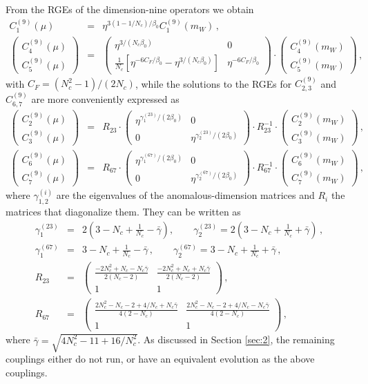 \documentclass[letterpaper,11pt]{article}
\newcommand{\bt}{\beta}
\newcommand{\g}{\gamma}
\newcommand{\bea}{\begin{eqnarray}}
\newcommand{\eea}{\end{eqnarray}}
\newcommand{\bma}{\begin{pmatrix}}
\newcommand{\ema}{\end{pmatrix}}
\newcommand{\sq}{^{2}}
\newcommand{\nn}{\nonumber}
\begin{document}
From the RGEs of the dimension-nine operators we obtain
\bea
C_1^{(9)}(\mu) &=& \eta^{3(1-1/N_c)/\bt_0} C_1^{(9)}(m_W)\,,\nn\\
\bma C_4^{(9)}(\mu)\\C_5^{(9)}(\mu)\ema  &=& 
\bma
\eta ^{3/(N_c \bt_0)} &0\\ \frac{1}{N_c}\left[\eta ^{-6C_F/ \bt_0}-\eta ^{3/(N_c \bt_0)}\right] & \eta ^{-6C_F/ \bt_0}
\ema
\cdot \bma C_4^{(9)}(m_W)\\C_5^{(9)}(m_W)\ema  \,,
\eea
with $C_F = (N_c\sq-1)/(2N_c)$, while the solutions to the RGEs for  $C_{2,3}^{(9)}$ and $C_{6,7}^{(9)}$ are more conveniently expressed as
\bea
\bma C_2^{(9)}(\mu)\\C_3^{(9)}(\mu)\ema  &=& R_{23}\cdot \bma
\eta^{\g_1^{(23)}/(2\bt_0)}&0\\ 0& \eta^{\g_2^{(23)}/(2\bt_0)}
\ema\cdot R^{-1}_{23}
\cdot \bma C_2^{(9)}(m_W)\\C_3^{(9)}(m_W)\ema  \,,\nn\\
\bma C_6^{(9)}(\mu)\\C_7^{(9)}(\mu)\ema  &=& R_{67}\cdot \bma
\eta^{\g_1^{(67)}/(2\bt_0)}&0\\ 0& \eta^{\g_2^{(67)}/(2\bt_0)}
\ema\cdot R_{67}^{-1}
\cdot \bma C_6^{(9)}(m_W)\\C_7^{(9)}(m_W)\ema  \,,
\eea
where $\g_{1,2}^{(i)}$ are the eigenvalues of the anomalous-dimension matrices and $R_i$ the matrices that diagonalize them. They can be written as
\bea
\g_1^{(23)} &=& 2\left(3-N_c+\frac{1}{N_c}- \bar\g\right),\qquad \g_2^{(23)} = 2\left(3-N_c+\frac{1}{N_c}+ \bar\g\right)\,, \nn\\
\g_1^{(67)} &=& 3-N_c+\frac{1}{N_c}- \bar\g\,,\qquad \g_2^{(67)} =3-N_c+\frac{1}{N_c}+ \bar\g\,,\nn\\
R_{23} &=& \bma \frac{-2N_c\sq+N_c-N_c \bar \g}{2(N_c-2)} &  \frac{-2N_c\sq+N_c+N_c \bar \g}{2(N_c-2)}\\ 1&1\ema\,,
\nn\\
R_{67} &=& \bma \frac{2N_c\sq-N_c-2+4/N_c+N_c \bar \g}{4(2-N_c)} &  \frac{2N_c\sq-N_c-2+4/N_c-N_c \bar \g}{4(2-N_c)}\\ 1&1\ema\,,
\eea
where $\bar \g =\sqrt{4N_c\sq-11+16/N_c\sq}$. As discussed in Section \ref{sec:2}, the remaining couplings either do not run, or have an equivalent evolution as the above couplings.
\end{document}
